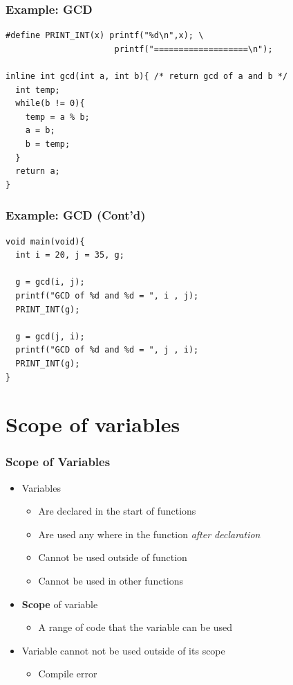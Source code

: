 \documentclass{../c-lecture}
\begin{document}
\begin{frame}[fragile]
  \frametitle{Example: GCD}
  \scriptsize
  \begin{verbatim}
#define PRINT_INT(x) printf("%d\n",x); \
                      printf("===================\n");

inline int gcd(int a, int b){ /* return gcd of a and b */
  int temp;
  while(b != 0){
    temp = a % b;
    a = b;
    b = temp;
  }
  return a;
}
  \end{verbatim}
\end{frame}

\begin{frame}[fragile]
  \frametitle{Example: GCD (Cont'd)}
  \scriptsize
  \begin{verbatim}
void main(void){
  int i = 20, j = 35, g;

  g = gcd(i, j);
  printf("GCD of %d and %d = ", i , j);
  PRINT_INT(g);

  g = gcd(j, i);
  printf("GCD of %d and %d = ", j , i);
  PRINT_INT(g);
}
  \end{verbatim}
\end{frame}

\section{Scope of variables}

\begin{frame}
  \frametitle{Scope of Variables}
  \begin{itemize}
    \item Variables
    \begin{itemize}
      \item Are declared in the start of functions
      \item
        Are used any where in the function
        \textit{\color{Orange} after declaration}
      \item Cannot be used outside of function
      \item Cannot be used in other functions
    \end{itemize}
    \item \textbf{\color{Melon} Scope} of variable
    \begin{itemize}
      \item A range of code that the variable can be used
    \end{itemize}
    \item Variable cannot not be used outside of its scope
    \begin{itemize}
      \item Compile error
    \end{itemize}
  \end{itemize}
\end{frame}
\end{document}
